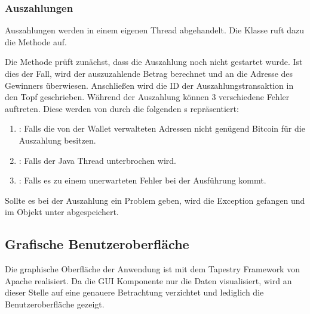 \subsubsection{Auszahlungen}
Auszahlungen werden in einem eigenen Thread abgehandelt. Die Klasse  ruft dazu die  Methode auf.

Die Methode prüft zunächst, dass die Auszahlung noch nicht gestartet wurde. Ist dies der Fall, wird der auszuzahlende Betrag berechnet und an die Adresse des Gewinners überwiesen. Anschließen wird die ID der Auszahlungstransaktion in den Topf geschrieben. Während der Auszahlung können 3 verschiedene Fehler auftreten. Diese werden von  durch die folgenden s repräsentiert: 
\begin{enumerate}
\item {}: Falls die von der Wallet verwalteten Adressen nicht genügend Bitcoin für die Auszahlung besitzen.
\item {}: Falls der Java Thread unterbrochen wird.
\item {}: Falls es zu einem unerwarteten Fehler bei der Ausführung kommt.
\end{enumerate}
Sollte es bei der Auszahlung ein Problem geben, wird die Exception gefangen und im  Objekt unter  abgespeichert.
\newpage
\subsection{Grafische Benutzeroberfläche}\label{ssec:btc_gui}

Die graphische Oberfläche der Anwendung ist mit dem Tapestry Framework von Apache realisiert. Da die GUI Komponente nur die Daten visualisiert, wird an dieser Stelle auf eine genauere Betrachtung verzichtet und lediglich die Benutzeroberfläche gezeigt.



